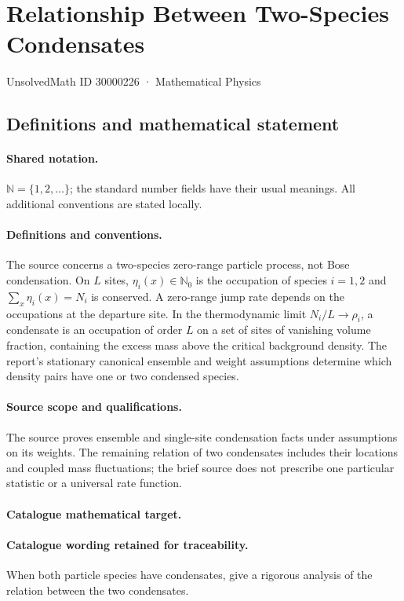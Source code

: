 \documentclass[11pt]{article}
\begin{document}
\setcounter{section}{30000225}
\section{Relationship Between Two-Species Condensates}\label{30000226}
{\small UnsolvedMath ID 30000226 · Mathematical Physics}
\subsection{Definitions and mathematical statement}

\paragraph{Shared notation.}$\mathbb N=\{1,2,\ldots\}$; the standard number fields have their usual meanings. All additional conventions are stated locally.


\paragraph{Definitions and conventions.} The source concerns a two-species zero-range particle process, not Bose condensation. On $L$ sites, $\eta_i(x)\in\mathbb N_0$ is the occupation of species $i=1,2$ and $\sum_x\eta_i(x)=N_i$ is conserved. A zero-range jump rate depends on the occupations at the departure site. In the thermodynamic limit $N_i/L\to\rho_i$, a condensate is an occupation of order $L$ on a set of sites of vanishing volume fraction, containing the excess mass above the critical background density. The report's stationary canonical ensemble and weight assumptions determine which density pairs have one or two condensed species.

\paragraph{Source scope and qualifications.} The source proves ensemble and single-site condensation facts under assumptions on its weights. The remaining relation of two condensates includes their locations and coupled mass fluctuations; the brief source does not prescribe one particular statistic or a universal rate function.

\paragraph{Catalogue mathematical target.}
\paragraph{Catalogue wording retained for traceability.}
When both particle species have condensates, give a rigorous analysis of the relation between the two condensates.
\end{document}

